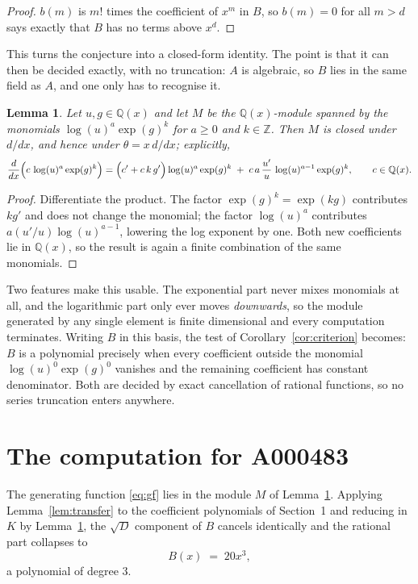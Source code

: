 \documentclass[11pt,a4paper]{article}
\theoremstyle{plain}
\newtheorem{lemma}[theorem]{Lemma}
\theoremstyle{definition}
\begin{document}
\begin{proof}
$b(m)$ is $m!$ times the coefficient of $x^{m}$ in $B$, so $b(m)=0$ for all $m>d$ says
exactly that $B$ has no terms above $x^{d}$.
\end{proof}

This turns the conjecture into a closed-form identity. The point is that it can then be
decided exactly, with no truncation: $A$ is algebraic, so $B$ lies in the same field as
$A$, and one only has to recognise it.

\begin{lemma}\label{lem:field}
Let $u,g\in\mathbb{Q}(x)$ and let $M$ be the $\mathbb{Q}(x)$-module spanned by the
monomials $\log(u)^{a}\exp(g)^{k}$ for $a\ge0$ and $k\in\mathbb{Z}$. Then $M$ is closed
under $d/dx$, and hence under $\theta=x\,d/dx$; explicitly,
\[
\frac{d}{dx}\Bigl(c\,\log(u)^{a}\exp(g)^{k}\Bigr)
=\Bigl(c'+c\,k\,g'\Bigr)\log(u)^{a}\exp(g)^{k}
\;+\;c\,a\,\frac{u'}{u}\,\log(u)^{a-1}\exp(g)^{k},
\qquad c\in\mathbb{Q}(x).
\]
\end{lemma}

\begin{proof}
Differentiate the product. The factor $\exp(g)^{k}=\exp(kg)$ contributes $kg'$ and does
not change the monomial; the factor $\log(u)^{a}$ contributes $a(u'/u)\log(u)^{a-1}$,
lowering the log exponent by one. Both new coefficients lie in $\mathbb{Q}(x)$, so the
result is again a finite combination of the same monomials.
\end{proof}

Two features make this usable. The exponential part never mixes monomials at all, and the
logarithmic part only ever moves \emph{downwards}, so the module generated by any single
element is finite dimensional and every computation terminates. Writing $B$ in this basis,
the test of Corollary~\ref{cor:criterion} becomes: $B$ is a polynomial precisely when every
coefficient outside the monomial $\log(u)^{0}\exp(g)^{0}$ vanishes and the remaining
coefficient has constant denominator. Both are decided by exact cancellation of rational
functions, so no series truncation enters anywhere.

\section{The computation for A000483}

The generating function \eqref{eq:gf} lies in the module $M$ of
Lemma~\ref{lem:field}.
Applying Lemma~\ref{lem:transfer} to the coefficient polynomials of Section~1 and reducing
in $K$ by Lemma~\ref{lem:field}, the $\sqrt{D}$ component of $B$ cancels identically and
the rational part collapses to
\[
B(x)\;=\;20 x^{3} ,
\]
a polynomial of degree $3$.
\end{document}
